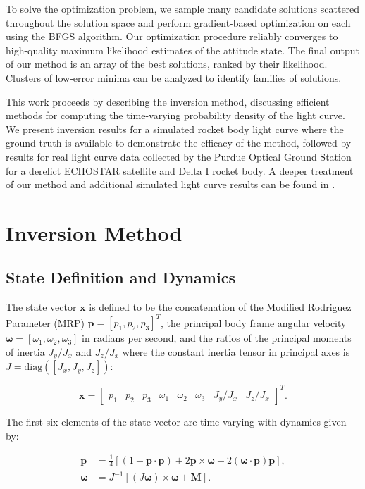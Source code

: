 \documentclass[a4paper,twocolumn]{spaceDebrisC} %
\newcommand{\vctr}[1]{\bm{#1}}
\begin{document}
To solve the optimization problem, we sample many candidate solutions scattered throughout the solution space and perform gradient-based optimization on each using the BFGS algorithm. Our optimization procedure reliably converges to high-quality maximum likelihood estimates of the attitude state. The final output of our method is an array of the best solutions, ranked by their likelihood. Clusters of low-error minima can be analyzed to identify families of solutions.

This work proceeds by describing the inversion method, discussing efficient methods for computing the time-varying probability density of the light curve. We present inversion results for a simulated rocket body light curve where the ground truth is available to demonstrate the efficacy of the method, followed by results for real light curve data collected by the Purdue Optical Ground Station for a derelict ECHOSTAR satellite and Delta I rocket body. A deeper treatment of our method and additional simulated light curve results can be found in \cite{robinson2025att}.

\section{Inversion Method}

\subsection{State Definition and Dynamics}

The state vector $\vctr{x}$ is defined to be the concatenation of the Modified Rodriguez Parameter (MRP) $\vctr{p} = [p_1, p_2, p_3]^T$, the principal body frame angular velocity $\vctr{\omega} = [\omega_1, \omega_2, \omega_3]$ in radians per second, and the ratios of the principal moments of inertia $J_y / J_x$ and $J_z / J_x$ where the constant inertia tensor in principal axes is $J = \mathrm{diag}\left([J_x, J_y, J_z]\right)$:

\begin{equation}
 \vctr{x} = \begin{bmatrix} 
 p_1 & p_2 & p_3 & \omega_1 & \omega_2 & \omega_3 & J_y / J_x & J_z / J_x
  \end{bmatrix}^T.
\end{equation}

The first six elements of the state vector are time-varying with dynamics given by:

\begin{align}
 \vctr{\dot{p}} &= \frac{1}{4} \left[ \left(1 - \vctr{p} \cdot \vctr{p}\right) + 2\vctr{p} \times \vctr{\omega} + 2 \left(\vctr{\omega} \cdot \vctr{p} \right)\vctr{p} \right], \label{eq:mrp_kde} \\
 \vctr{\dot{\omega}} &= J^{-1} \left[ \left(J \vctr{\omega}\right) \times \vctr{\omega} + \vctr{M}\right]. \label{eq:rbtf_dynamics}
\end{align}
\end{document}
